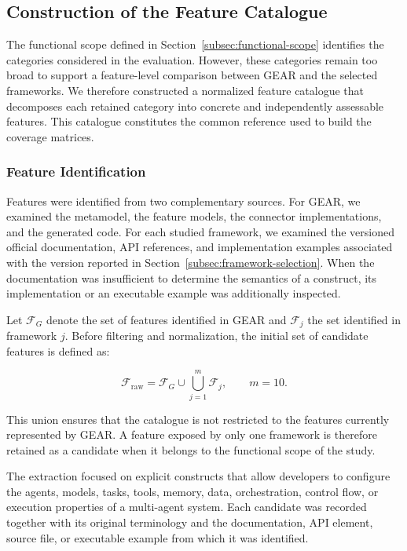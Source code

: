 \subsection{Construction of the Feature Catalogue}
\label{subsec:feature-catalogue}

The functional scope defined in
Section~\ref{subsec:functional-scope} identifies the categories considered in
the evaluation. However, these categories remain too broad to support a
feature-level comparison between GEAR and the selected frameworks. We
therefore constructed a normalized feature catalogue that decomposes each
retained category into concrete and independently assessable features. This
catalogue constitutes the common reference used to build the coverage
matrices.

\subsubsection{Feature Identification}

Features were identified from two complementary sources. For GEAR, we examined
the metamodel, the feature models, the connector implementations, and the
generated code. For each studied framework, we examined the versioned official
documentation, API references, and implementation examples associated with
the version reported in Section~\ref{subsec:framework-selection}. When the
documentation was insufficient to determine the semantics of a construct, its
implementation or an executable example was additionally inspected.

Let $\mathcal{F}_{G}$ denote the set of features identified in GEAR and
$\mathcal{F}_{j}$ the set identified in framework $j$. Before filtering and
normalization, the initial set of candidate features is defined as:

\begin{equation}
    \mathcal{F}_{\mathrm{raw}}
    =
    \mathcal{F}_{G}
    \cup
    \bigcup_{j=1}^{m}\mathcal{F}_{j},
    \qquad m = 10.
    \label{eq:raw-feature-catalogue}
\end{equation}

This union ensures that the catalogue is not restricted to the features
currently represented by GEAR. A feature exposed by only one framework is
therefore retained as a candidate when it belongs to the functional scope of
the study.

The extraction focused on explicit constructs that allow developers to
configure the agents, models, tasks, tools, memory, data, orchestration,
control flow, or execution properties of a multi-agent system. Each candidate
was recorded together with its original terminology and the documentation,
API element, source file, or executable example from which it was identified.

